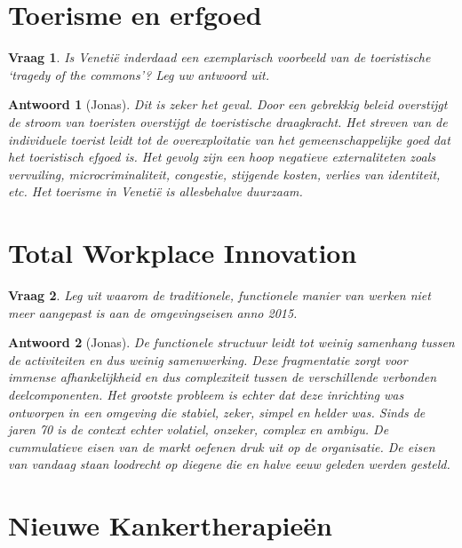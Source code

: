 \documentclass{article}
\theoremstyle{nonumberplain}
\newtheorem{question}{Vraag}
\newtheorem{answer}{Antwoord}
\begin{document}
\section{Toerisme en erfgoed}

\begin{question}
Is Venetië inderdaad een exemplarisch voorbeeld van de toeristische `tragedy of
the commons'? Leg uw antwoord uit.
\end{question}

\begin{answer}[Jonas]

Dit is zeker het geval. Door een gebrekkig beleid overstijgt de stroom van
toeristen overstijgt de toeristische draagkracht. Het streven van de individuele
toerist leidt tot de overexploitatie van het gemeenschappelijke goed dat het
toeristisch efgoed is. Het gevolg zijn een hoop negatieve externaliteten zoals
vervuiling, microcriminaliteit, congestie, stijgende kosten, verlies van
identiteit, etc. Het toerisme in Venetië is allesbehalve duurzaam.

\end{answer}

\section{Total Workplace Innovation}

\begin{question}
Leg uit waarom de traditionele, functionele manier van werken niet meer
aangepast is aan de omgevingseisen anno 2015.
\end{question}

\begin{answer}[Jonas]

De functionele structuur leidt tot weinig samenhang tussen de activiteiten en
dus weinig samenwerking. Deze fragmentatie zorgt voor immense afhankelijkheid
en dus complexiteit tussen de verschillende verbonden deelcomponenten. Het
grootste probleem is echter dat deze inrichting was ontworpen in een omgeving
die stabiel, zeker, simpel en helder was. Sinds de jaren 70 is de context echter
volatiel, onzeker, complex en ambigu. De cummulatieve eisen van de markt oefenen
druk uit op de organisatie. De eisen van vandaag staan loodrecht op diegene die
en halve eeuw geleden werden gesteld.

\end{answer}

\section{Nieuwe Kankertherapieën}
\end{document}
